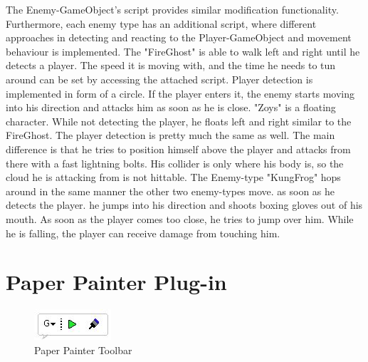 The Enemy-GameObject’s script provides similar modification functionality. Furthermore, each enemy type has an additional script, where different approaches in detecting and reacting to the Player-GameObject and movement behaviour is implemented.
The "FireGhost" is able to walk left and right until he detects a player. The speed it is moving with, and the time he needs to tun around can be set by accessing the attached script. Player detection is implemented in form of a circle. If the player enters it, the enemy starts moving into his direction and attacks him as soon as he is close.
"Zoys" is a floating character. While not detecting the player, he floats left and right similar to the FireGhost. The player detection is pretty much the same as well. The main difference is that he tries to position himself above the player and attacks from there with a fast lightning bolts. His collider is only where his body is, so the cloud he is attacking from is not hittable.
The Enemy-type "KungFrog" hops around in the same manner the other two enemy-types move. as soon as he detects the player. he jumps into his direction and shoots boxing gloves out of his mouth. As soon as the player comes too close, he tries to jump over him. While he is falling, the player can receive damage from touching him.

\section{Paper Painter Plug-in}

\begin{figure}
	\centering
	\includegraphics[scale=0.9]{grafiken/meltoolbar.jpg}
	\caption{Paper Painter Toolbar}
	\label{fig:4}
\end{figure}


